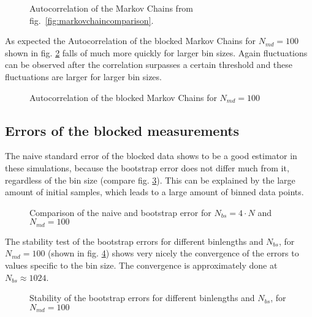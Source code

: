 \documentclass{scrartcl}
\begin{document}
\begin{figure}[htbp]
	
	\caption{Autocorrelation of the Markov Chains from fig.~\ref{fig:markovchaincomparison}.}
	\label{fig:simplecorrelation}
\end{figure}

%	
As expected the Autocorrelation of the blocked Markov Chains for $N_{md}=100$ shown in fig. \ref{fig:correlationbinnmd100} falls of much more quickly for larger bin sizes. Again fluctuations can be observed after the correlation surpasses a certain threshold and these fluctuations are larger for larger bin sizes.
\begin{figure}[htbp]
	
	\caption{Autocorrelation of the blocked Markov Chains for $N_{md}=100$}
	\label{fig:correlationbinnmd100}
\end{figure}

%
%	

\subsection{Errors of the blocked measurements}
The naive standard error of the blocked data shows to be a good estimator in these simulations, because the bootstrap error does not differ much from it, regardless of the bin size (compare fig. \ref{fig:errorbinnedcompare}). This can be explained by the large amount of initial samples, which leads to a large amount of binned data points.
\begin{figure}[htbp]
	
	\caption{Comparison of the naive and bootstrap error for $N_{bs}=4\cdot N$ and $N_{md}=100$}
	\label{fig:errorbinnedcompare}
\end{figure}

%	
The stability test of the bootstrap errors for different binlengths and $N_{bs}$, for $N_{md}=100$ (shown in fig. \ref{fig:errorstabilitynmd100}) shows very nicely the convergence of the errors to values specific to  the bin size. The convergence is approximately done at $N_{bs}\approx 1024$.
\begin{figure}[htbp]
	
	\caption{Stability of the bootstrap errors for different binlengths and $N_{bs}$, for $N_{md}=100$}
	\label{fig:errorstabilitynmd100}
\end{figure}
\newpage	
\listoffigures
\printbibliography
\end{document}
